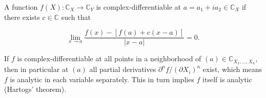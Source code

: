 A function $f(X): \mathbb{C}_X \to \mathbb{C}_Y$ is complex-differentiable at $a = a_1 + i a_2 \in \mathbb{C}_X$ if there exists $c \in \mathbb{C}$ such that

$$\lim_{x \to a} \frac{f(x) - [f(a) + c(x - a)]}{|x - a|} = 0.$$

If $f$ is complex-differentiable at all points in a neighborhood of $(a) \in \mathbb{C}_{X_1, \ldots, X_n}$, then in particular at $(a)$ all partial derivatives $\partial^n f / (\partial X_i)^n$ exist, which means $f$ is analytic in each variable separately. This in turn implies $f$ itself is analytic (Hartogs' theorem).

